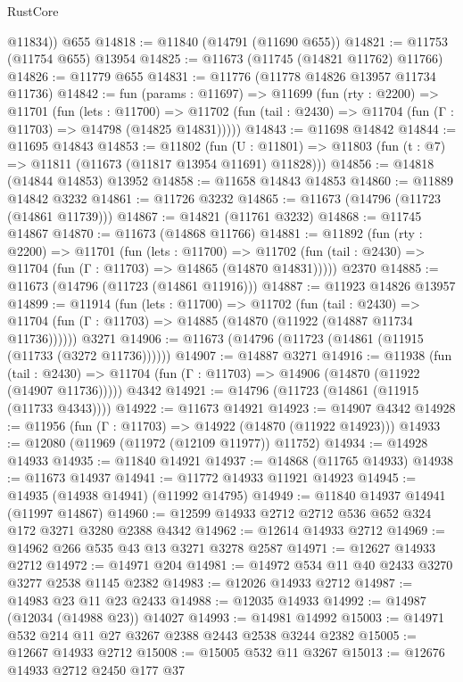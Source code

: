 \begin{lexlean}{RustCore}
\begin{coremodule}
        @11834))
    @655
@14818 := @11840 (@14791 (@11690 @655))
@14821 := @11753 (@11754 @655) @13954
@14825 := @11673 (@11745 (@14821 @11762) @11766)
@14826 := @11779 @655
@14831 := @11776 (@11778 @14826 @13957 @11734 @11736)
@14842 := fun (params : @11697) =>
  @11699
    (fun (rty : @2200) =>
    @11701
      (fun (lets : @11700) =>
      @11702 (fun (tail : @2430) => @11704 (fun (Γ : @11703) => @14798 (@14825 @14831)))))
@14843 := @11698 @14842
@14844 := @11695 @14843
@14853 := @11802
    (fun (U : @11801) => @11803 (fun (t : @7) => @11811 (@11673 (@11817 @13954 @11691) @11828)))
@14856 := @14818 (@14844 @14853) @13952
@14858 := @11658 @14843 @14853
@14860 := @11889 @14842 @3232
@14861 := @11726 @3232
@14865 := @11673 (@14796 (@11723 (@14861 @11739)))
@14867 := @14821 (@11761 @3232)
@14868 := @11745 @14867
@14870 := @11673 (@14868 @11766)
@14881 := @11892
    (fun (rty : @2200) =>
    @11701
      (fun (lets : @11700) =>
      @11702 (fun (tail : @2430) => @11704 (fun (Γ : @11703) => @14865 (@14870 @14831)))))
    @2370
@14885 := @11673 (@14796 (@11723 (@14861 @11916)))
@14887 := @11923 @14826 @13957
@14899 := @11914
    (fun (lets : @11700) =>
    @11702
      (fun (tail : @2430) =>
      @11704 (fun (Γ : @11703) => @14885 (@14870 (@11922 (@14887 @11734 @11736))))))
    @3271
@14906 := @11673 (@14796 (@11723 (@14861 (@11915 (@11733 (@3272 @11736))))))
@14907 := @14887 @3271
@14916 := @11938
    (fun (tail : @2430) => @11704 (fun (Γ : @11703) => @14906 (@14870 (@11922 (@14907 @11736)))))
    @4342
@14921 := @14796 (@11723 (@14861 (@11915 (@11733 @4343))))
@14922 := @11673 @14921
@14923 := @14907 @4342
@14928 := @11956 (fun (Γ : @11703) => @14922 (@14870 (@11922 @14923)))
@14933 := @12080 (@11969 (@11972 (@12109 @11977)) @11752)
@14934 := @14928 @14933
@14935 := @11840 @14921
@14937 := @14868 (@11765 @14933)
@14938 := @11673 @14937
@14941 := @11772 @14933 @11921 @14923
@14945 := @14935 (@14938 @14941) (@11992 @14795)
@14949 := @11840 @14937 @14941 (@11997 @14867)
@14960 := @12599 @14933 @2712 @2712 @536 @652 @324 @172 @3271 @3280 @2388 @4342
@14962 := @12614 @14933 @2712
@14969 := @14962 @266 @535 @43 @13 @3271 @3278 @2587
@14971 := @12627 @14933 @2712
@14972 := @14971 @204
@14981 := @14972 @534 @11 @40 @2433 @3270 @3277 @2538 @1145 @2382
@14983 := @12026 @14933 @2712
@14987 := @14983 @23 @11 @23 @2433
@14988 := @12035 @14933
@14992 := @14987 (@12034 (@14988 @23)) @14027
@14993 := @14981 @14992
@15003 := @14971 @532 @214 @11 @27 @3267 @2388 @2443 @2538 @3244 @2382
@15005 := @12667 @14933 @2712
@15008 := @15005 @532 @11 @3267
@15013 := @12676 @14933 @2712 @2450 @177 @37

\end{coremodule}
\end{lexlean}
